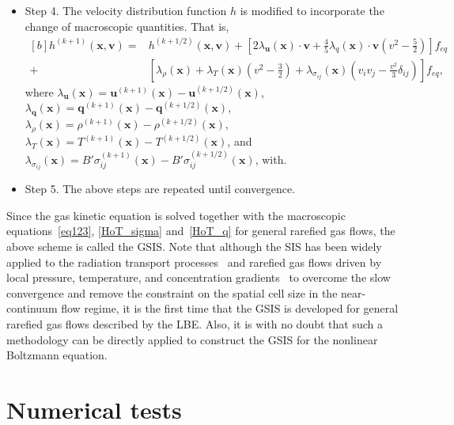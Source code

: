 \begin{itemize}
	
	\item  Step 4. The velocity distribution function $h$ is modified to incorporate the change of macroscopic quantities. That is,
	\begin{equation}\label{guided0}
	\begin{aligned}[b]
	h^{(k+1)}(\bm{x},\bm{v})=&h^{(k+1/2)}(\bm{x},\bm{v})
	+\left[2\lambda_{\bm{u}}(\bm{x})\cdot{\bm{v}}+\frac{4}{5}{\lambda_q}(\bm{x})\cdot\bm{v}\left(v^2-\frac{5}{2}\right)\right]f_{eq}\\
	+&\left[\lambda_{\rho}(\bm{x})+\lambda_T(\bm{x})\left(v^2-\frac{3}{2}\right)
	+\lambda_{\sigma_{ij}}(\bm{x})\left(v_iv_j-\frac{v^2}{3}\delta_{ij}\right)\right]f_{eq},
	\end{aligned}
	\end{equation}
	where $\lambda_{\bm{u}}(\bm{x})=\bm{u}^{(k+1)}(\bm{x})-\bm{u}^{(k+1/2)}(\bm{x})$, $\lambda_{\bm{q}}(\bm{x})=\bm{q}^{(k+1)}(\bm{x})-\bm{q}^{(k+1/2)}(\bm{x})$, $\lambda_{\rho}(\bm{x})=\rho^{(k+1)}(\bm{x})-\rho^{(k+1/2)}(\bm{x})$,  $\lambda_T(\bm{x})=T^{(k+1)}(\bm{x})-T^{(k+1/2)}(\bm{x})$, and $\lambda_{\sigma_{ij}}(\bm{x})=B'\sigma_{ij}^{(k+1)}(\bm{x})-B'\sigma_{ij}^{(k+1/2)}(\bm{x})$, with. 
	
	\item Step 5. The above steps are repeated until convergence.
\end{itemize}





Since the gas kinetic equation is solved together with the macroscopic equations~\eqref{eq123}, \eqref{HoT_sigma} and~\eqref{HoT_q} for general rarefied gas flows, the above scheme is called the GSIS. Note that although the SIS has been widely applied to the radiation transport processes~\cite{DSA2002} and rarefied gas flows driven by local pressure, temperature, and concentration gradients~\cite{Valougeorgis:2003zr,Naris2005Pof,CircularSIS2013,szalmas2010,WeiSuJCP1} to overcome the slow convergence and remove the constraint on the spatial cell size in the near-continuum flow regime, it is the first time that the GSIS is developed for general rarefied gas flows described by the LBE.  Also, it is with no doubt that such a methodology can be directly applied to construct the GSIS for the nonlinear Boltzmann equation.






\section{Numerical tests} \label{sec:results1}

